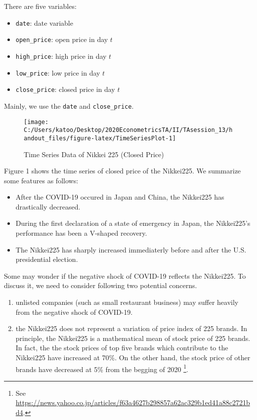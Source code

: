\documentclass[
  12pt,
]{article}
\providecommand{\tightlist}{%
  \setlength{\itemsep}{0pt}\setlength{\parskip}{0pt}}
\begin{document}
There are five variables:

\begin{itemize}
\tightlist
\item
  \texttt{date}: date variable
\item
  \texttt{open\_price}: open price in day \(t\)
\item
  \texttt{high\_price}: high price in day \(t\)
\item
  \texttt{low\_price}: low price in day \(t\)
\item
  \texttt{close\_price}: closed price in day \(t\)
\end{itemize}

Mainly, we use the \texttt{date} and \texttt{close\_price}.

\begin{figure}[h]

{\centering \texttt{[image: C:/Users/katoo/Desktop/2020EconometricsTA/II/TAsession\_13/handout\_files/figure-latex/TimeSeriesPlot-1]} 

}

\caption{Time Series Data of Nikkei 225 (Closed Price)}\label{fig:TimeSeriesPlot}
\end{figure}

Figure 1 shows the time series of closed price of the Nikkei225. We
summarize some features as follows:

\begin{itemize}
\tightlist
\item
  After the COVID-19 occured in Japan and China, the Nikkei225 has
  drastically decreased.
\item
  During the first declaration of a state of emergency in Japan, the
  Nikkei225's performance has been a V-shaped recovery.
\item
  The Nikkei225 has sharply increased immediaterly before and after the
  U.S. presidential election.
\end{itemize}

Some may wonder if the negative shock of COVID-19 reflects the
Nikkei225. To discuss it, we need to consider following two potential
concerns.

\begin{enumerate}
\def\labelenumi{\arabic{enumi}.}
\tightlist
\item
  unlisted companies (such as small restaurant business) may suffer
  heavily from the negative shock of COVID-19.
\item
  the Nikkei225 does not represent a variation of price index of 225
  brands. In principle, the Nikkei225 is a mathematical mean of stock
  price of 225 brands. In fact, the the stock prices of top five brands
  which contribute to the Nikkei225 have increased at 70\%. On the other
  hand, the stock price of other brands have decreased at 5\% from the
  begging of 2020 \footnote{See
    \url{https://news.yahoo.co.jp/articles/f63a4627b298857a62ac329b1ed41a88c2721bd4}.}.
\end{enumerate}
\end{document}

